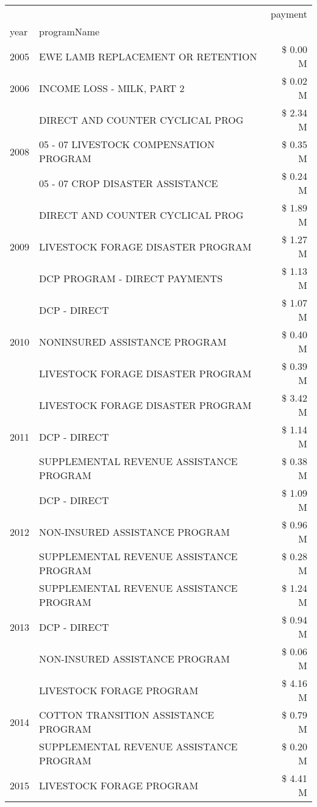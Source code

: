 \begin{tabular}{llr}
\toprule
 &  & payment \\
year & programName &  \\
\midrule
2005 & EWE LAMB REPLACEMENT OR RETENTION & \$ 0.00 M \\
\cline{1-3}
2006 & INCOME LOSS - MILK, PART 2 & \$ 0.02 M \\
\cline{1-3}
\multirow[t]{3}{*}{2008} & DIRECT AND COUNTER CYCLICAL PROG & \$ 2.34 M \\
 & 05 - 07 LIVESTOCK COMPENSATION PROGRAM & \$ 0.35 M \\
 & 05 - 07 CROP DISASTER ASSISTANCE & \$ 0.24 M \\
\cline{1-3}
\multirow[t]{3}{*}{2009} & DIRECT AND COUNTER CYCLICAL PROG & \$ 1.89 M \\
 & LIVESTOCK FORAGE DISASTER  PROGRAM & \$ 1.27 M \\
 & DCP PROGRAM - DIRECT PAYMENTS & \$ 1.13 M \\
\cline{1-3}
\multirow[t]{3}{*}{2010} & DCP - DIRECT & \$ 1.07 M \\
 & NONINSURED ASSISTANCE PROGRAM & \$ 0.40 M \\
 & LIVESTOCK FORAGE DISASTER PROGRAM & \$ 0.39 M \\
\cline{1-3}
\multirow[t]{3}{*}{2011} & LIVESTOCK FORAGE DISASTER PROGRAM & \$ 3.42 M \\
 & DCP - DIRECT & \$ 1.14 M \\
 & SUPPLEMENTAL REVENUE ASSISTANCE PROGRAM & \$ 0.38 M \\
\cline{1-3}
\multirow[t]{3}{*}{2012} & DCP - DIRECT & \$ 1.09 M \\
 & NON-INSURED ASSISTANCE PROGRAM & \$ 0.96 M \\
 & SUPPLEMENTAL REVENUE ASSISTANCE PROGRAM & \$ 0.28 M \\
\cline{1-3}
\multirow[t]{3}{*}{2013} & SUPPLEMENTAL REVENUE ASSISTANCE PROGRAM & \$ 1.24 M \\
 & DCP - DIRECT & \$ 0.94 M \\
 & NON-INSURED ASSISTANCE PROGRAM & \$ 0.06 M \\
\cline{1-3}
\multirow[t]{3}{*}{2014} & LIVESTOCK FORAGE PROGRAM & \$ 4.16 M \\
 & COTTON TRANSITION ASSISTANCE PROGRAM & \$ 0.79 M \\
 & SUPPLEMENTAL REVENUE ASSISTANCE PROGRAM & \$ 0.20 M \\
\cline{1-3}
\multirow[t]{3}{*}{2015} & LIVESTOCK FORAGE PROGRAM & \$ 4.41 M \\

\end{tabular}
